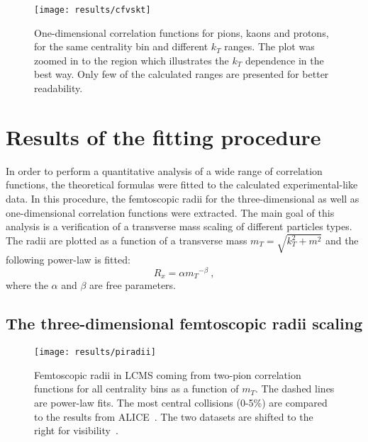       \begin{figure}[h]
        \centering
        \centerline{\texttt{[image: results/cfvskt]}}
        \caption{One-dimensional correlation functions for pions, kaons and protons, for the same centrality bin and different $k_T$ ranges. The plot was zoomed in to the region which illustrates the $k_T$ dependence in the best way. Only few of the calculated ranges are presented for better readability.}
      \label{fig:kt_dep}
      \end{figure}
    \FloatBarrier
    \clearpage
  \section{Results of the fitting procedure}
  In order to perform a quantitative analysis of a wide range of correlation functions, the theoretical formulas were fitted to the calculated experimental-like data.
  In this procedure, the femtoscopic radii for the three-dimensional as well as one-dimensional correlation functions were extracted.
  The main goal of this analysis is a verification of a transverse mass scaling of different particles types.
  The radii are plotted as a function of a transverse mass $m_T = \sqrt{k_T^2 +m^2}$ and the following power-law is fitted:
  \begin{equation}
    \label{eq:power-law}
    R_x = \alpha {m_T}^{-\beta}~,
  \end{equation}
  where the $\alpha$ and $\beta$ are free parameters.
    \subsection{The three-dimensional femtoscopic radii scaling}
      \begin{figure}[b]
        \centering
        \centerline{\texttt{[image: results/piradii]}}
        \caption{Femtoscopic radii in LCMS coming from two-pion correlation functions for all centrality bins as a function of $m_T$. The dashed lines are power-law fits. The most central collisions (0-5\%) are compared to the results from ALICE~\cite{alice_pion}. The two datasets are shifted to the right for visibility~\cite{galazyn}.}
        \label{fig:piradii}
      \end{figure}

